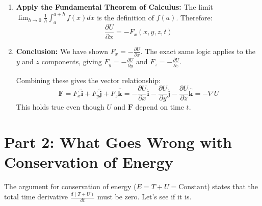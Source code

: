 \documentclass[11pt, a4paper]{article} %
\begin{document}
\begin{enumerate}
    \item \textbf{Apply the Fundamental Theorem of Calculus:}
    The limit $\lim_{h \to 0} \frac{1}{h} \int_a^{a+h} f(x) dx$ is the definition of $f(a)$. Therefore:
    $$\frac{\partial U}{\partial x} = - F_x(x, y, z, t)$$

    \item \textbf{Conclusion:}
    We have shown $F_x = -\frac{\partial U}{\partial x}$. The exact same logic applies to the $y$ and $z$ components, giving $F_y = -\frac{\partial U}{\partial y}$ and $F_z = -\frac{\partial U}{\partial z}$.
    
    Combining these gives the vector relationship:
    $$\mathbf{F} = F_x \hat{\mathbf{i}} + F_y \hat{\mathbf{j}} + F_z \hat{\mathbf{k}} = -\frac{\partial U}{\partial x} \hat{\mathbf{i}} - \frac{\partial U}{\partial y} \hat{\mathbf{j}} - \frac{\partial U}{\partial z} \hat{\mathbf{k}} = - \nabla U$$
    This holds true even though $U$ and $\mathbf{F}$ depend on time $t$.
\end{enumerate}

\hrulefill

\section*{Part 2: What Goes Wrong with Conservation of Energy}

The argument for conservation of energy ($E = T+U = \text{Constant}$) states that the total time derivative $\frac{d(T+U)}{dt}$ must be zero. Let's see if it is.
\end{document}
